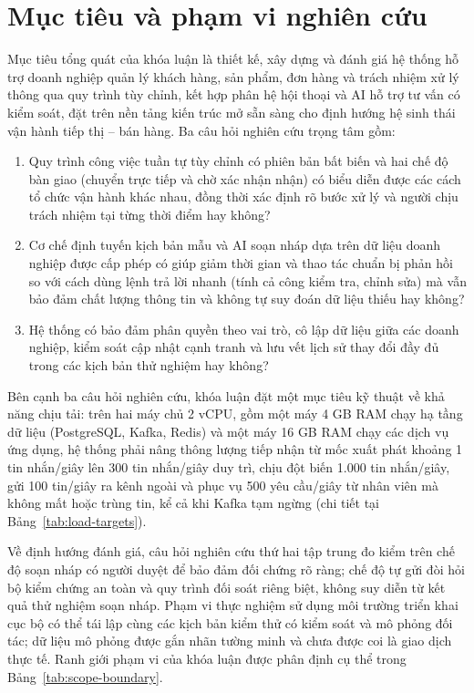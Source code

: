 \section{Mục tiêu và phạm vi nghiên cứu}
Mục tiêu tổng quát của khóa luận là thiết kế, xây dựng và đánh giá hệ thống hỗ trợ doanh nghiệp quản lý khách hàng, sản phẩm, đơn hàng và trách nhiệm xử lý thông qua quy trình tùy chỉnh, kết hợp phân hệ hội thoại và AI hỗ trợ tư vấn có kiểm soát, đặt trên nền tảng kiến trúc mở sẵn sàng cho định hướng hệ sinh thái vận hành tiếp thị -- bán hàng. Ba câu hỏi nghiên cứu trọng tâm gồm:
\begin{enumerate}
  \item Quy trình công việc tuần tự tùy chỉnh có phiên bản bất biến và hai chế độ bàn giao (chuyển trực tiếp và chờ xác nhận nhận) có biểu diễn được các cách tổ chức vận hành khác nhau, đồng thời xác định rõ bước xử lý và người chịu trách nhiệm tại từng thời điểm hay không?
  \item Cơ chế định tuyến kịch bản mẫu và AI soạn nháp dựa trên dữ liệu doanh nghiệp được cấp phép có giúp giảm thời gian và thao tác chuẩn bị phản hồi so với cách dùng lệnh trả lời nhanh (tính cả công kiểm tra, chỉnh sửa) mà vẫn bảo đảm chất lượng thông tin và không tự suy đoán dữ liệu thiếu hay không?
  \item Hệ thống có bảo đảm phân quyền theo vai trò, cô lập dữ liệu giữa các doanh nghiệp, kiểm soát cập nhật cạnh tranh và lưu vết lịch sử thay đổi đầy đủ trong các kịch bản thử nghiệm hay không?
\end{enumerate}

Bên cạnh ba câu hỏi nghiên cứu, khóa luận đặt một mục tiêu kỹ thuật về khả năng chịu tải: trên hai máy chủ 2 vCPU, gồm một máy 4 GB RAM chạy hạ tầng dữ liệu (PostgreSQL, Kafka, Redis) và một máy 16 GB RAM chạy các dịch vụ ứng dụng, hệ thống phải nâng thông lượng tiếp nhận từ mốc xuất phát khoảng 1 tin nhắn/giây lên 300 tin nhắn/giây duy trì, chịu đột biến 1.000 tin nhắn/giây, gửi 100 tin/giây ra kênh ngoài và phục vụ 500 yêu cầu/giây từ nhân viên mà không mất hoặc trùng tin, kể cả khi Kafka tạm ngừng (chi tiết tại Bảng~\ref{tab:load-targets}).

Về định hướng đánh giá, câu hỏi nghiên cứu thứ hai tập trung đo kiểm trên chế độ soạn nháp có người duyệt để bảo đảm đối chứng rõ ràng; chế độ tự gửi đòi hỏi bộ kiểm chứng an toàn và quy trình đối soát riêng biệt, không suy diễn từ kết quả thử nghiệm soạn nháp. Phạm vi thực nghiệm sử dụng môi trường triển khai cục bộ có thể tái lập cùng các kịch bản kiểm thử có kiểm soát và mô phỏng đối tác; dữ liệu mô phỏng được gắn nhãn tường minh và chưa được coi là giao dịch thực tế. Ranh giới phạm vi của khóa luận được phân định cụ thể trong Bảng~\ref{tab:scope-boundary}.

